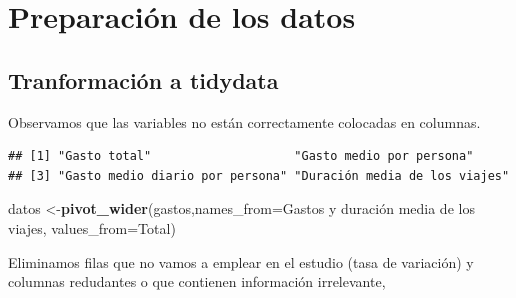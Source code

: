 \documentclass[data,article,submit,moreauthors,pdftex]{Definitions/mdpi}
\newenvironment{Shaded}{\begin{snugshade}}{\end{snugshade}}
\newcommand{\AttributeTok}[1]{\textcolor[rgb]{0.13,0.29,0.53}{#1}}
\newcommand{\CommentTok}[1]{\textcolor[rgb]{0.56,0.35,0.01}{\textit{#1}}}
\newcommand{\FunctionTok}[1]{\textcolor[rgb]{0.13,0.29,0.53}{\textbf{#1}}}
\newcommand{\NormalTok}[1]{#1}
\newcommand{\OtherTok}[1]{\textcolor[rgb]{0.56,0.35,0.01}{#1}}
\newcommand{\SpecialCharTok}[1]{\textcolor[rgb]{0.81,0.36,0.00}{\textbf{#1}}}
\newcommand{\StringTok}[1]{\textcolor[rgb]{0.31,0.60,0.02}{#1}}
\begin{document}
\hypertarget{preparaciuxf3n-de-los-datos}{%
\section{Preparación de los datos}\label{preparaciuxf3n-de-los-datos}}

\hypertarget{tranformaciuxf3n-a-tidydata}{%
\subsection{Tranformación a
tidydata}\label{tranformaciuxf3n-a-tidydata}}

Observamos que las variables no están correctamente colocadas en
columnas.

\begin{Shaded}
\end{Shaded}

\begin{verbatim}
## [1] "Gasto total"                    "Gasto medio por persona"       
## [3] "Gasto medio diario por persona" "Duración media de los viajes"
\end{verbatim}

\begin{Shaded}
\begin{Highlighting}[]
\NormalTok{datos }\OtherTok{\textless{}{-}}\FunctionTok{pivot\_wider}\NormalTok{(gastos,}\AttributeTok{names\_from=}\StringTok{\textasciigrave{}}\AttributeTok{Gastos y duración media de los viajes}\StringTok{\textasciigrave{}}\NormalTok{, }\AttributeTok{values\_from=}\NormalTok{Total)}
\end{Highlighting}
\end{Shaded}

Eliminamos filas que no vamos a emplear en el estudio (tasa de
variación) y columnas redudantes o que contienen información
irrelevante,

\begin{Shaded}
\end{Shaded}
\end{document}
